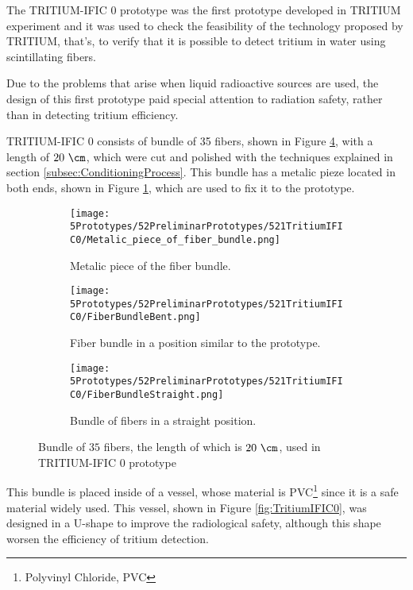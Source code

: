 The TRITIUM-IFIC 0 prototype was the first prototype developed in TRITIUM experiment and it was used to check the feasibility of the technology proposed by TRITIUM, that's, to verify that it is possible to detect tritium in water using scintillating fibers.

Due to the problems that arise when liquid radioactive sources are used, the design of this first prototype paid special attention to radiation safety, rather than in detecting tritium efficiency.

TRITIUM-IFIC 0 consists of bundle of 35 fibers, shown in Figure \ref{fig:FiberBundleOfTritiumIFIC0}, with a length of $20~\cm$, which were cut and polished with the techniques explained in section \ref{subsec:ConditioningProcess}. This bundle has a metalic pieze located in both ends, shown in Figure \ref{subfig:MetalicPieceFiberBunchTritiumIFIC0}, which are used to fix it to the prototype.

\begin{figure}
\centering
    \begin{subfigure}[b]{0.5\textwidth}
    \centering
    \texttt{[image: 5Prototypes/52PreliminarPrototypes/521TritiumIFIC0/Metalic\_piece\_of\_fiber\_bundle.png]}  
    \caption{Metalic piece of the fiber bundle. \label{subfig:MetalicPieceFiberBunchTritiumIFIC0}}
    \end{subfigure}
    \hfill
    \begin{subfigure}[b]{0.4\textwidth}
    \centering
    \texttt{[image: 5Prototypes/52PreliminarPrototypes/521TritiumIFIC0/FiberBundleBent.png]}  
    \caption{Fiber bundle in a position similar to the prototype.\label{subfig:FiberBunchTritiumIFIC0Bent}}
    \end{subfigure}
    \hfill
    \begin{subfigure}[b]{0.7\textwidth}
    \centering
    \texttt{[image: 5Prototypes/52PreliminarPrototypes/521TritiumIFIC0/FiberBundleStraight.png]}  
    \caption{Bundle of fibers in a straight position.\label{subfig:FiberBunchTritiumIFIC0}}
    \end{subfigure}
 \caption{Bundle of $35$ fibers, the length of which is $20~\cm$, used in TRITIUM-IFIC 0 prototype}
 \label{fig:FiberBundleOfTritiumIFIC0}
\end{figure}

This bundle is placed inside of a vessel, whose material is PVC\footnote{Polyvinyl Chloride, PVC}  since it is a safe material widely used. This vessel, shown in Figure \ref{fig:TritiumIFIC0}, was designed in a U-shape to improve the radiological safety, although this shape worsen the efficiency of tritium detection.

